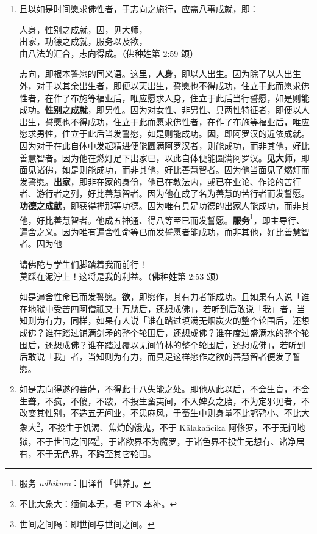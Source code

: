 \begin{enumerate}
\item 且以如是时间愿求佛性者，于志向之施行，应需八事成就，即：\begin{quoting}人身，性别之成就，因，见大师，\\出家，功德之成就，服务以及欲，\\由八法的汇合，志向得成。（佛种姓第 2:59 颂）\end{quoting}志向，即根本誓愿的同义语。这里，\textbf{人身}，即以人出生。因为除了以人出生外，对于以其余出生者，即便以天出生，誓愿也不得成功，住立于此而愿求佛性者，在作了布施等福业后，唯应愿求人身，住立于此后当行誓愿，如是则能成功。\textbf{性别之成就}，即男性。因为对女性、非男性、具两性特征者，即便以人出生，誓愿也不得成功，住立于此而愿求佛性者，在作了布施等福业后，唯应愿求男性，住立于此后当发誓愿，如是则能成功。\textbf{因}，即阿罗汉的近依成就。因为对于在此自体中发起精进便能圆满阿罗汉者，则能成功，而非其他，好比善慧智者。因为他在燃灯足下出家已，以此自体便能圆满阿罗汉。\textbf{见大师}，即面见诸佛，如是则能成功，而非其他，好比善慧智者。因为他当面见了燃灯而发誓愿。\textbf{出家}，即非在家的身份，他已在教法内，或已在业论、作论的苦行者、游行者之列，好比善慧智者。因为他在成了名为善慧的苦行者而发誓愿。\textbf{功德之成就}，即获得禅那等功德。因为唯有具足功德的出家人能成功，而非其他，好比善慧智者。他成五神通、得八等至已而发誓愿。\textbf{服务}\footnote{服务 \textit{adhikāra}：旧译作「供养」。}，即主导行、遍舍之义。因为唯有遍舍性命等已而发誓愿者能成功，而非其他，好比善慧智者。因为他\begin{quoting}请佛陀与学生们脚踏着我而前行！\\莫踩在泥泞上！这将是我的利益。（佛种姓第 2:53 颂）\end{quoting}如是遍舍性命已而发誓愿。\textbf{欲}，即愿作，其有力者能成功。且如果有人说「谁在地狱中受苦四阿僧祇又十万劫后，还想成佛」，若听到后敢说「我」者，当知则为有力，同样，如果有人说「谁在踏过填满无烟炭火的整个轮围后，还想成佛？谁在踏过铺满剑矛的整个轮围后，还想成佛？谁在度过盛满水的整个轮围后，还想成佛？谁在踏过覆以无间竹林的整个轮围后，还想成佛」，若听到后敢说「我」者，当知则为有力，而具足这样愿作之欲的善慧智者便发了誓愿。
\item 如是志向得遂的菩萨，不得此十八失能之处。即他从此以后，不会生盲，不会生聋，不疯，不傻，不跛，不投生蛮夷间，不入婢女之胎，不为定邪见者，不改变其性别，不造五无间业，不患麻风，于畜生中则身量不比鹌鹑小、不比大象大\footnote{不比大象大：缅甸本无，据 PTS 本补。}，不投生于饥渴、焦灼的饿鬼，不于 Kālakañcika 阿修罗，不于无间地狱，不于世间之间隔\footnote{世间之间隔：即世间与世间之间。}，于诸欲界不为魔罗，于诸色界不投生无想有、诸净居有，不于无色界，不跨至其它轮围。

\end{enumerate}
